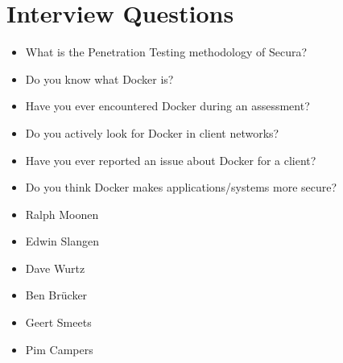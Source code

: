 \chapter{Interview Questions}\label{appendix:Interview-Questions}

\begin{itemize}
    \item What is the Penetration Testing methodology of Secura?
\end{itemize}

\begin{itemize}
    \item Do you know what Docker is?
    \item Have you ever encountered Docker during an assessment?
    \item Do you actively look for Docker in client networks?
    \item Have you ever reported an issue about Docker for a client?
    \item Do you think Docker makes applications/systems more secure?
\end{itemize}

\begin{itemize}
    \item Ralph Moonen
    \item Edwin Slangen
    \item Dave Wurtz
    \item Ben Brücker
    \item Geert Smeets
    \item Pim Campers
\end{itemize}
